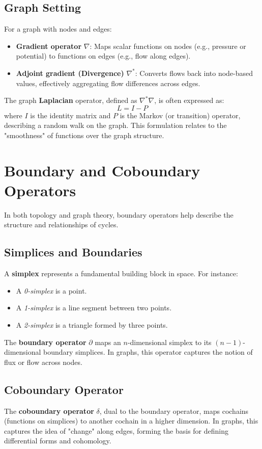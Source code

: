 \documentclass[10pt,a4paper,twocolumn]{article}
\begin{document}
	\subsection{Graph Setting}
	For a graph with nodes and edges:
	\begin{itemize}
		\item \textbf{Gradient operator} \( \nabla \): Maps scalar functions on nodes (e.g., pressure or potential) to functions on edges (e.g., flow along edges).
		\item \textbf{Adjoint gradient (Divergence)} \( \nabla^* \): Converts flows back into node-based values, effectively aggregating flow differences across edges.
	\end{itemize}
	
	The graph \textbf{Laplacian} operator, defined as \( \nabla^* \nabla \), is often expressed as:
	\[
	L = I - P
	\]
	where \( I \) is the identity matrix and \( P \) is the Markov (or transition) operator, describing a random walk on the graph. This formulation relates to the "smoothness" of functions over the graph structure.
	
	\section{Boundary and Coboundary Operators}
	In both topology and graph theory, boundary operators help describe the structure and relationships of cycles.
	
	\subsection{Simplices and Boundaries}
	A \textbf{simplex} represents a fundamental building block in space. For instance:
	\begin{itemize}
		\item A \textit{0-simplex} is a point.
		\item A \textit{1-simplex} is a line segment between two points.
		\item A \textit{2-simplex} is a triangle formed by three points.
	\end{itemize}
	
	The \textbf{boundary operator} \( \partial \) maps an \( n \)-dimensional simplex to its \((n-1)\)-dimensional boundary simplices. In graphs, this operator captures the notion of flux or flow across nodes.
	
	\subsection{Coboundary Operator}
	The \textbf{coboundary operator} \( \delta \), dual to the boundary operator, maps cochains (functions on simplices) to another cochain in a higher dimension. In graphs, this captures the idea of "change" along edges, forming the basis for defining differential forms and cohomology.
	
\end{document}
